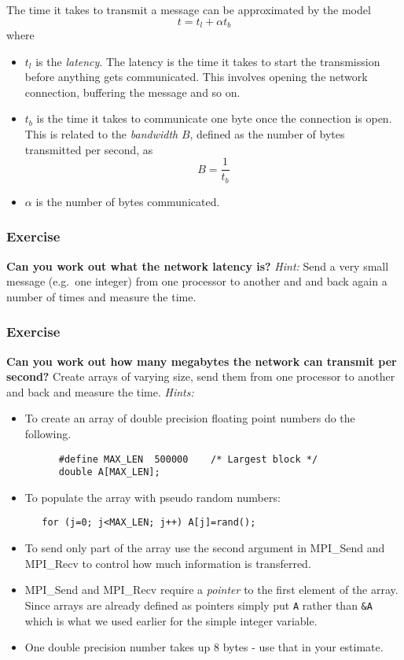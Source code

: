 \documentclass[12pt]{article}
\begin{document}
The time it takes to transmit a message can be approximated by the model
\[
  t = t_l + \alpha t_b
\]
where
\begin{itemize}
  \item $t_l$ is the \emph{latency}. The latency is the
  time it takes to start the transmission before anything
  gets communicated. This involves opening the network connection,
  buffering the message and so on.
  \item $t_b$ is the time it takes to communicate one byte once
  the connection is open. This is related to the \emph{bandwidth} $B$,
  defined as the number of bytes transmitted per second, as
  \[
    B = \frac{1}{t_b}
  \]
  \item $\alpha$ is the number of bytes communicated.
\end{itemize}

\subsubsection*{Exercise}
\textbf{Can you work out what the network latency is?}
\emph{Hint:} Send a very small message (e.g.\ one integer)
from one processor to another and and back again a number of times
and measure the time.

\subsubsection*{Exercise}
\textbf{Can you work out how many megabytes the network can transmit per
second?}
Create arrays of varying size, send them from one processor
to another and back and measure the time.
\emph{Hints:}
\begin{itemize}
  \item To create an array of double precision floating point numbers
    do the following.
    \begin{verbatim}
      #define MAX_LEN  500000    /* Largest block */
      double A[MAX_LEN];
    \end{verbatim}
  \item To populate the array with pseudo random numbers:
  \begin{verbatim}
   for (j=0; j<MAX_LEN; j++) A[j]=rand();
   \end{verbatim}
   \item To send only part of the array use the second argument in
   MPI\_Send and MPI\_Recv to control how much information is transferred.
   \item MPI\_Send and MPI\_Recv require a \emph{pointer} to the first
   element of the array. Since arrays are already defined as pointers
   simply put \texttt{A} rather than \texttt{\&A} which is what
   we used earlier for the
   simple integer variable.
   \item One double precision number takes up 8 bytes - use that in your
   estimate.
\end{itemize}
\end{document}
